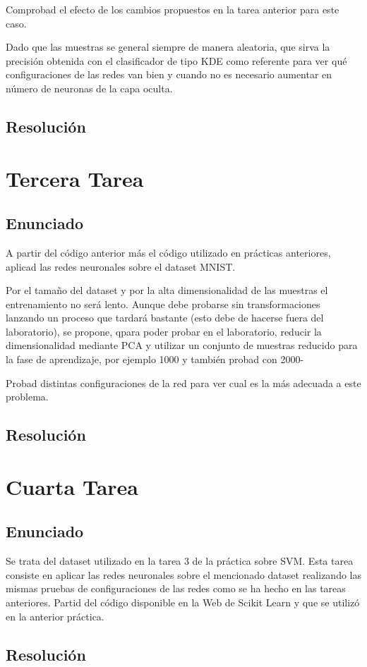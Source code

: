 \documentclass[12pt,twoside]{article}
\begin{document}
Comprobad el efecto de los cambios propuestos en la tarea anterior para este caso.

Dado que las muestras se general siempre de manera aleatoria, que sirva la precisión obtenida con el clasificador de tipo KDE como referente para ver qué configuraciones de las redes van bien y cuando no es necesario aumentar en número de neuronas de la capa oculta.


\subsection{Resolución}

\section{Tercera Tarea}

\subsection{Enunciado}
A partir del código anterior más el código utilizado en prácticas anteriores, aplicad las redes neuronales sobre el dataset MNIST.

Por el tamaño del dataset y por la alta dimensionalidad de las muestras el entrenamiento no será lento. Aunque debe probarse sin transformaciones lanzando un proceso que tardará bastante (esto debe de hacerse fuera del laboratorio), se propone, qpara poder probar en el laboratorio, reducir la dimensionalidad mediante PCA y utilizar un conjunto de muestras reducido para la fase de aprendizaje, por ejemplo 1000 y también probad con 2000-

Probad distintas configuraciones de la red para ver cual es la más adecuada a este problema.

\subsection{Resolución}

\section{Cuarta Tarea}
\subsection{Enunciado}
Se trata del dataset utilizado en la tarea 3 de la práctica sobre SVM. Esta tarea consiste en aplicar las redes neuronales sobre el mencionado dataset realizando las mismas pruebas de configuraciones de las redes como se ha hecho en las tareas anteriores. Partid del código disponible en la Web de Scikit Learn y que se utilizó en la anterior práctica.

\subsection{Resolución}
\end{document}
